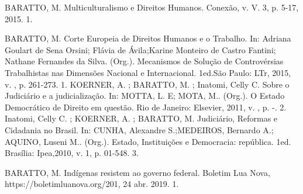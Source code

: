 

\begin{cvhonors}
  \cvhonor
    {BARATTO, M.}
    {Multiculturalismo e Direitos Humanos. Conexão, v. V. 3, p. 5-17, 2015.}
    {}
    {1. }
\end{cvhonors}



\begin{cvhonors}
  \cvhonor
    {BARATTO, M.}
    {Corte Europeia de Direitos Humanos e o Trabalho. In: Adriana Goulart de Sena Orsini; Flávia de Ávila;Karine Monteiro de Castro Fantini; Nathane Fernandes da Silva. (Org.). Mecanismos de Solução de Controvérsias Trabalhistas nas Dimensões Nacional e Internacional. 1ed.São Paulo: LTr, 2015, v. , p. 261-273.}
    {}
    {1. }
  \cvhonor
    {KOERNER, A. ; BARATTO, M. ; Inatomi, Celly C.}
    {Sobre o Judiciário e a judicialização. In: MOTTA, L. E; MOTA, M.. (Org.). O Estado Democrático de Direito em questão. Rio de Janeiro: Elsevier, 2011, v. , p. -.}
    {}
    {2. }
  \cvhonor
    {Inatomi, Celly C. ; KOERNER, A. ; BARATTO, M.}
    {Judiciário, Reformas e Cidadania no Brasil. In: CUNHA, Alexandre S.;MEDEIROS, Bernardo A.; AQUINO, Luseni M.. (Org.). Estado, Instituições e Democracia: república. 1ed. Brasília: Ipea,2010, v. 1, p. 01-548.}
    {}
    {3. }
\end{cvhonors}


\begin{cvhonors}
  \cvhonor
    {BARATTO, M.}
    {Indígenas resistem ao governo federal. Boletim Lua Nova, https://boletimluanova.org/201, 24 abr. 2019.}
    {}
    {1. }
\end{cvhonors}


